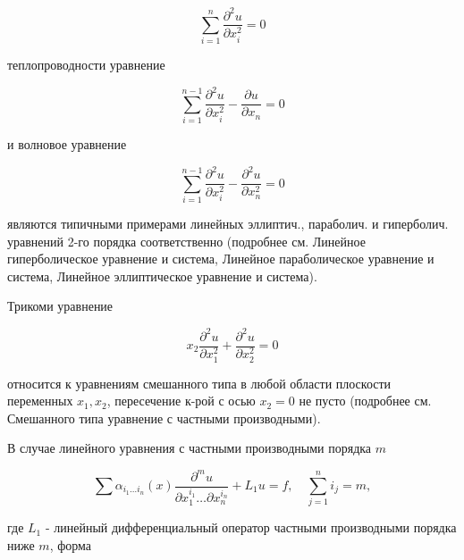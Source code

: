 \documentclass[10pt]{article}
\begin{document}
\[

\sum_{i=1}^{n} \frac{\partial^{2} u}{\partial x_{i}^{2}}=0

\]



теплопроводности уравнение



\[

\sum_{i=1}^{n-1} \frac{\partial^{2} u}{\partial x_{i}^{2}}-\frac{\partial u}{\partial x_{n}}=0

\]



и волновое уравнение



\[

\sum_{i=1}^{n-1} \frac{\partial^{2} u}{\partial x_{i}^{2}}-\frac{\partial^{2} u}{\partial x_{n}^{2}}=0

\]



являются типичными примерами линейных эллиптич., параболич. и гиперболич. уравнений 2-го порядка соответственно (подробнее см. Линейное гиперболическое уравнение и система, Линейное параболическое уравнение и система, Линейное эллиптическое уравнение и система).



Трикоми уравнение



\[

x_{2} \frac{\partial^{2} u}{\partial x_{1}^{2}}+\frac{\partial^{2} u}{\partial x_{2}^{2}}=0

\]



относится к уравнениям смешанного типа в любой области плоскости переменных $x_{1}, x_{2}$, пересечение к-рой с осью $x_{2}=0$ не пусто (подробнее см. Смешанного типа уравнение с частными производными).



В случае линейного уравнения с частными производными порядка $m$



\[

\sum \alpha_{i_{1} \ldots i_{n}}(x) \frac{\partial^{m} u}{\partial x_{1}^{i_{1}} \ldots \partial x_{n}^{i_{n}}}+L_{1} u=f, \quad \sum_{j=1}^{n} i_{j}=m,

\]



где $L_{1}$ - линейный дифференциальный оператор частными производными порядка ниже $m$, форма
\end{document}

